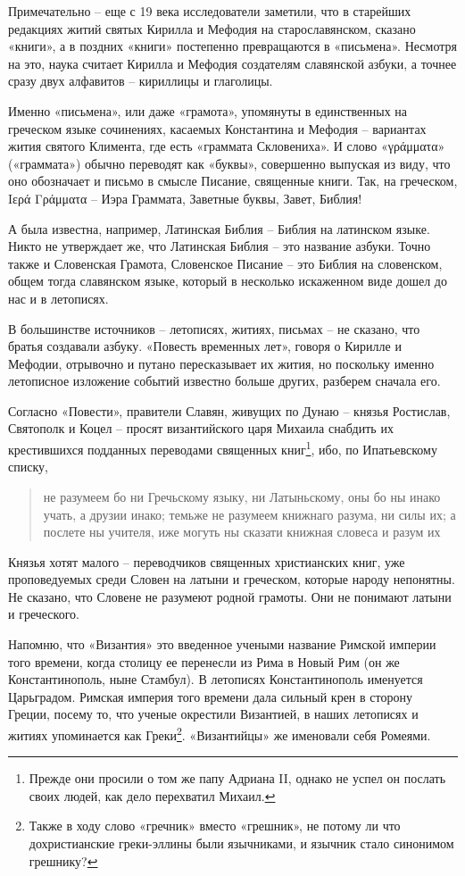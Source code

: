 Примечательно – еще с 19 века исследователи заметили, что в старейших редакциях житий святых Кирилла и Мефодия на старославянском, сказано «книги», а в поздних «книги» постепенно превращаются в «письмена». Несмотря на это, наука считает Кирилла и Мефодия создателям славянской азбуки, а точнее сразу двух алфавитов – кириллицы и глаголицы.

Именно «письмена», или даже «грамота», упомянуты в единственных на греческом языке сочинениях, касаемых Константина и Мефодия – вариантах жития святого Климента, где есть «граммата Скловениха». И слово «γράμματα» («граммата») обычно переводят как «буквы», совершенно выпуская из виду, что оно обозначает и письмо в смысле Писание, священные книги. Так, на греческом, Iερά Γράμματα – Иэра Граммата, Заветные буквы, Завет, Библия!

А была известна, например, Латинская Библия – Библия на латинском языке. Никто не утверждает же, что Латинская Библия – это название азбуки. Точно также и Словенская Грамота, Словенское Писание – это Библия на словенском, общем тогда славянском языке, который в несколько искаженном виде дошел до нас и в летописях.

В большинстве источников – летописях, житиях, письмах – не сказано, что братья создавали азбуку. «Повесть временных лет», говоря о Кирилле и Мефодии, отрывочно и путано пересказывает их жития, но поскольку именно летописное изложение событий известно больше других, разберем сначала его.

Согласно «Повести», правители Славян, живущих по Дунаю – князья Ростислав, Святополк и Коцел – просят византийского царя Михаила снабдить их крестившихся подданных переводами священных книг\footnote{Прежде они просили о том же папу Адриана II, однако не успел он послать своих людей, как дело перехватил Михаил.}, ибо, по Ипатьевскому списку,

\begin{quotation}
не разумеем бо ни Гречьскому языку, ни Латыньскому, оны бо ны инако учать, а друзии инако; темьже не разумеем книжнаго разума, ни силы их; а послете ны учителя, иже могуть ны сказати книжная словеса и разум их
\end{quotation}

Князья хотят малого – переводчиков священных христианских книг, уже проповедуемых среди Словен на латыни и греческом, которые народу непонятны. Не сказано, что Словене не разумеют родной грамоты. Они не понимают латыни и греческого.

Напомню, что «Византия» это введенное учеными название Римской империи того времени, когда столицу ее перенесли из Рима в Новый Рим (он же Константинополь, ныне Стамбул). В летописях Константинополь именуется Царьградом. Римская империя того времени дала сильный крен в сторону Греции, посему то, что ученые окрестили Византией, в наших летописях и житиях упоминается как Греки\footnote{Также в ходу слово «гречник» вместо «грешник», не потому ли что дохристианские греки-эллины были язычниками, и язычник стало синонимом грешнику?}. «Византийцы» же именовали себя Ромеями. 

